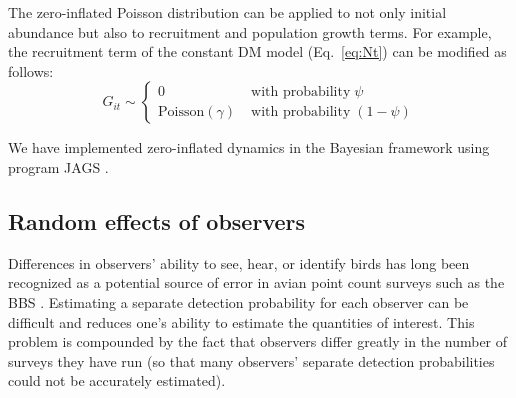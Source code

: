 \documentclass[12pt]{article}
\begin{document}

The zero-inflated Poisson distribution can be applied to not only
initial abundance but also to recruitment and population growth terms.
For example, the recruitment term of the constant DM model
(Eq.~\ref{eq:Nt}) can be modified as follows:
\begin{equation}
G_{it} \sim \left\{
\begin{aligned}
0 &\; \text{with probability} \; \psi \\
\mathrm{Poisson}(\gamma) &\; \text{with probability} \; (1-\psi)
\end{aligned} \right.
\label{eq:ZIPts}
\end{equation}

We have implemented
zero-inflated dynamics in the Bayesian framework using program
\textrm{JAGS} \citep[version 3.2.0]{plummer:2003}.


\subsection{Random effects of observers}

Differences in observers' ability to see, hear, or identify
birds has long been recognized as a potential source of error
in avian point count surveys such as the BBS
\citep{robbins_etal:1986,diefenbach_etal:2003,sauer_etal:1994auk,alldredge_etal:2007auk,campbell_francis:2011}.
Estimating a separate detection probability for each observer can be
difficult and reduces one's ability to estimate the quantities
of interest.  This problem is compounded by the fact that
observers differ greatly in the number of surveys they have
run (so that many observers' separate detection probabilities
could not be accurately estimated).
\end{document}
